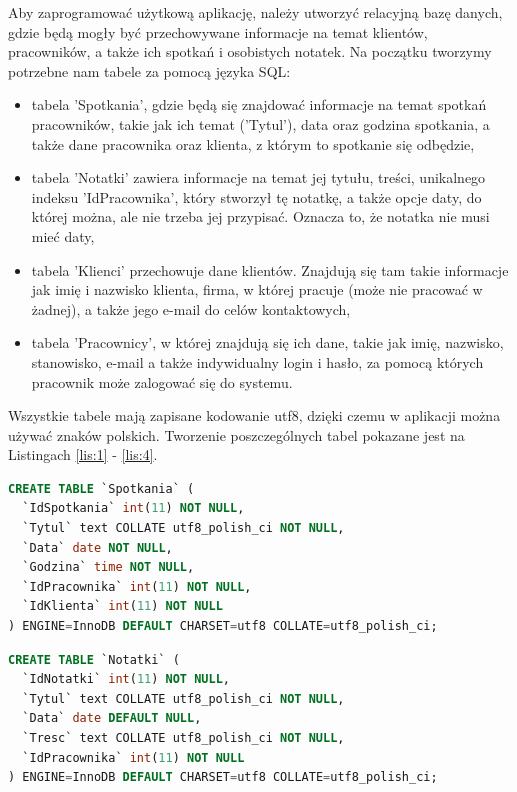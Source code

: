 \documentclass[eng,printmode,openany,oneside]{mgr}
\begin{document}
Aby zaprogramować użytkową aplikację, należy utworzyć relacyjną bazę danych, gdzie będą mogły być przechowywane informacje na temat klientów, pracowników, a także ich spotkań i osobistych notatek. Na początku tworzymy potrzebne nam tabele za pomocą języka SQL:
\begin{itemize}
\item tabela 'Spotkania', gdzie będą się znajdować informacje na temat spotkań pracowników, takie jak ich temat ('Tytul'), data oraz godzina spotkania, a także dane pracownika oraz klienta, z którym to spotkanie się odbędzie,
\item tabela 'Notatki' zawiera informacje na temat jej tytułu, treści, unikalnego indeksu 'IdPracownika', który stworzył tę notatkę, a także opcje daty, do której można, ale nie trzeba jej przypisać. Oznacza to, że notatka nie musi mieć daty,
\item tabela 'Klienci' przechowuje dane klientów. Znajdują się tam takie informacje jak imię i nazwisko klienta, firma, w której pracuje (może nie pracować w żadnej), a także jego e-mail do celów kontaktowych,
\item tabela 'Pracownicy', w której znajdują się ich dane, takie jak imię, nazwisko, stanowisko, e-mail a także indywidualny login i hasło, za pomocą których pracownik może zalogować się do systemu.
\end{itemize}
Wszystkie tabele mają zapisane kodowanie utf8, dzięki czemu w aplikacji można używać znaków polskich. Tworzenie poszczególnych tabel pokazane jest na Listingach \ref{lis:1}  - \ref{lis:4}.



\newpage




\begin{center}	
\begin{lstlisting}[caption={Stworzenie tabeli spotkań}, language=SQL, label={lis:1}]
CREATE TABLE `Spotkania` (
  `IdSpotkania` int(11) NOT NULL,
  `Tytul` text COLLATE utf8_polish_ci NOT NULL,
  `Data` date NOT NULL,
  `Godzina` time NOT NULL,
  `IdPracownika` int(11) NOT NULL,
  `IdKlienta` int(11) NOT NULL
) ENGINE=InnoDB DEFAULT CHARSET=utf8 COLLATE=utf8_polish_ci;
\end{lstlisting}
\end{center}
	
	
	
\begin{lstlisting}[caption={Stworzenie tabeli notatek}, language=SQL, label={lis:2}]
CREATE TABLE `Notatki` (
  `IdNotatki` int(11) NOT NULL,
  `Tytul` text COLLATE utf8_polish_ci NOT NULL,
  `Data` date DEFAULT NULL,
  `Tresc` text COLLATE utf8_polish_ci NOT NULL,
  `IdPracownika` int(11) NOT NULL
) ENGINE=InnoDB DEFAULT CHARSET=utf8 COLLATE=utf8_polish_ci;
\end{lstlisting}
	
\end{document}
